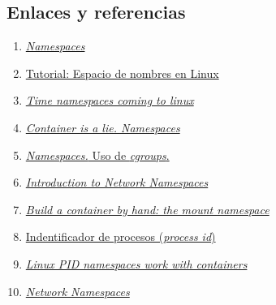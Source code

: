 \documentclass[12pt]{article}
\begin{document}
	\subsection*{Enlaces y referencias}
	\begin{enumerate}
		\item 
		\label{bib:ns overview} \href{https://lwn.net/Articles/531114/}{\textit{Namespaces}}
		
		\item 
		\label{bib:ns tutorial1} \href{https://laurel.datsi.fi.upm.es/~ssoo/SOA/namespaces.html}{Tutorial: Espacio de nombres en Linux}
		
		\item 
		\label{bib:time ns} \href{https://www.phoronix.com/scan.php?page=news_item&px=Linux-Time-Namespace-Coming}{\textit{Time namespaces coming to linux}}
		
		\item 
		\label{bib:container is a lie} \href{https://platform.sh/blog/2020/the-container-is-a-lie/}{\textit{Container is a lie. Namespaces}}
		
		\item 
		\label{bib:link5} \href{https://locurastecnicas.blogspot.com/2020/09/linux-namespaces-y-cgroups.html}{\textit{Namespaces.} Uso de \textit{cgroups}.}
		
		\item 
		\label{bib:link6} \href{https://www.youtube.com/watch?v=_WgUwUf1d34}{\textit{Introduction to Network Namespaces}}
		
		
		\item
		\label{bib: mount namespace redhat} \href{https://www.redhat.com/sysadmin/mount-namespaces}{\textit{Build a container by hand: the mount namespace}}
		
		
		\item
		\label{bib:pid wikipedia}
		\href{https://en.wikipedia.org/wiki/Process_identifier}{Indentificador de procesos (\textit{process id})}
		
		
		\item
		\label{bib:link9}
		\href{https://www.redhat.com/sysadmin/linux-pid-namespaces}{\textit{Linux PID namespaces work with containers}}
		
		\item
		\label{bib:link10}
		\href{https://blogs.igalia.com/dpino/2016/04/10/network-namespaces/}{\textit{Network Namespaces}}
		

\end{enumerate}
\end{document}

